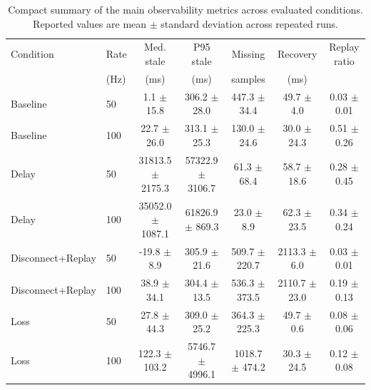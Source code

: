 \begin{table}[t]
\centering
\caption{Compact summary of the main observability metrics across evaluated conditions. Reported values are mean $\pm$ standard deviation across repeated runs.}
\label{tab:results_compact}
\scriptsize
\begin{tabular}{llccccc}
\hline
Condition & Rate & Med. stale & P95 stale & Missing & Recovery & Replay ratio \\
& (Hz) & (ms) & (ms) & samples & (ms) & \\
\hline
Baseline & 50 & 1.1 $\pm$ 15.8 & 306.2 $\pm$ 28.0 & 447.3 $\pm$ 34.4 & 49.7 $\pm$ 4.0 & 0.03 $\pm$ 0.01 \\
Baseline & 100 & 22.7 $\pm$ 26.0 & 313.1 $\pm$ 25.3 & 130.0 $\pm$ 24.6 & 30.0 $\pm$ 24.3 & 0.51 $\pm$ 0.26 \\
Delay & 50 & 31813.5 $\pm$ 2175.3 & 57322.9 $\pm$ 3106.7 & 61.3 $\pm$ 68.4 & 58.7 $\pm$ 18.6 & 0.28 $\pm$ 0.45 \\
Delay & 100 & 35052.0 $\pm$ 1087.1 & 61826.9 $\pm$ 869.3 & 23.0 $\pm$ 8.9 & 62.3 $\pm$ 23.5 & 0.34 $\pm$ 0.24 \\
Disconnect+Replay & 50 & -19.8 $\pm$ 8.9 & 305.9 $\pm$ 21.6 & 509.7 $\pm$ 220.7 & 2113.3 $\pm$ 6.0 & 0.03 $\pm$ 0.01 \\
Disconnect+Replay & 100 & 38.9 $\pm$ 34.1 & 304.4 $\pm$ 13.5 & 536.3 $\pm$ 373.5 & 2110.7 $\pm$ 23.0 & 0.19 $\pm$ 0.13 \\
Loss & 50 & 27.8 $\pm$ 44.3 & 309.0 $\pm$ 25.2 & 364.3 $\pm$ 225.3 & 49.7 $\pm$ 0.6 & 0.08 $\pm$ 0.06 \\
Loss & 100 & 122.3 $\pm$ 103.2 & 5746.7 $\pm$ 4996.1 & 1018.7 $\pm$ 474.2 & 30.3 $\pm$ 24.5 & 0.12 $\pm$ 0.08 \\
\hline
\end{tabular}
\end{table}
